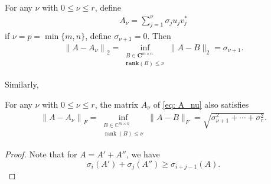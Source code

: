 \begin{theorem}
\label{thm: low-rank approx of 2 norm}
For any $\nu$ with $0 \leq \nu \leq r$, define
\begin{align}
    \label{eq: A_nu}
A_\nu=\sum_{j=1}^\nu \sigma_j u_j v_j^*
\end{align}
if $\nu=p=\min \{m, n\}$, define $\sigma_{\nu+1}=0$. Then
\begin{align*}
\left\|A-A_\nu\right\|_2=\inf _{\substack{B \in \mathbf{C}^{m \times n} \\ \mathbf{r a n k}(B) \leq \nu}}\|A-B\|_2=\sigma_{\nu+1} .
\end{align*}
\end{theorem}
Similarly, 
 
 \begin{theorem}
 \label{thm: Low rank approx under f norm}
For any $\nu$ with $0 \leq \nu \leq r$, the matrix $A_\nu$ of \eqref{eq: A_nu} also satisfies
\begin{align*}
\left\|A-A_\nu\right\|_F=\inf _{\substack{B \in \mathbb{C}^{m \times n} \\ \operatorname{rank}(B) \leq \nu}}\|A-B\|_F=\sqrt{\sigma_{\nu+1}^2+\cdots+\sigma_r^2} .
\end{align*}
 \end{theorem}
 \begin{proof}
 Note that for $A= A' + A''$, we have 
 \[
    \sigma _i (A')  + \sigma _j (A'') \ge \sigma_{i+j-1} (A). 
 \]
 \end{proof}
 